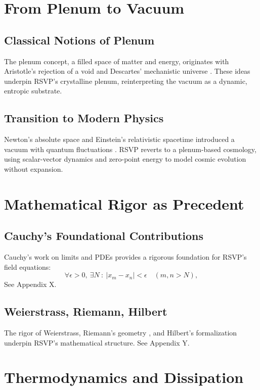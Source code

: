 \documentclass[12pt]{report}
\begin{document}
\chapter{From Plenum to Vacuum}
\section{Classical Notions of Plenum}
The plenum concept, a filled space of matter and energy, originates with Aristotle’s rejection of a void \citep{AristotlePhysics} and Descartes’ mechanistic universe \citep{Descartes1644}. These ideas underpin RSVP’s crystalline plenum, reinterpreting the vacuum as a dynamic, entropic substrate.

\section{Transition to Modern Physics}
Newton’s absolute space \citep{Newton1687} and Einstein’s relativistic spacetime \citep{Einstein1915} introduced a vacuum with quantum fluctuations \citep{Dirac1930}. RSVP reverts to a plenum-based cosmology, using scalar-vector dynamics and zero-point energy to model cosmic evolution without expansion.

\chapter{Mathematical Rigor as Precedent}
\section{Cauchy’s Foundational Contributions}
Cauchy’s work on limits and PDEs \citep{Cauchy1821} provides a rigorous foundation for RSVP’s field equations:
\begin{equation}
\forall \epsilon > 0, \ \exists N \ : \ |x_m - x_n| < \epsilon \quad (m, n > N), \label{eq:cauchy}
\end{equation}
See Appendix X.

\section{Weierstrass, Riemann, Hilbert}
The rigor of Weierstrass, Riemann’s geometry \citep{Riemann1854}, and Hilbert’s formalization \citep{Hilbert1900} underpin RSVP’s mathematical structure. See Appendix Y.

\chapter{Thermodynamics and Dissipation}
\end{document}
